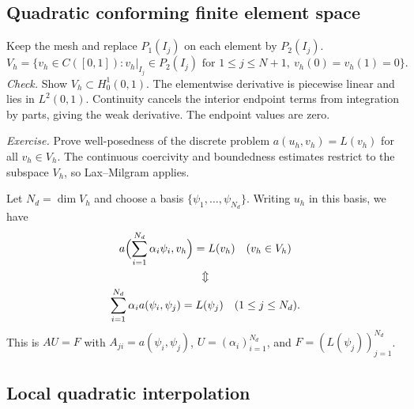 \documentclass[11pt,a4paper]{article}
\begin{document}
\subsection{Quadratic conforming finite element space}

Keep the mesh and replace \(P_1(I_j)\) on each element by \(P_2(I_j)\).
\[
 V_h=\bigl\{v_h\in C([0,1]):v_h|_{I_j}\in P_2(I_j)
 \text{ for }1\le j\le N+1,\ v_h(0)=v_h(1)=0\bigr\}.
\]
\emph{Check.} Show \(V_h\subset H_0^1(0,1)\). The elementwise derivative
is piecewise linear and lies in \(L^2(0,1)\). Continuity cancels the
interior endpoint terms from integration by parts, giving the weak
derivative. The endpoint values are zero.

\emph{Exercise.} Prove well-posedness of the discrete problem
\(a(u_h,v_h)=L(v_h)\) for all \(v_h\in V_h\). The continuous
coercivity and boundedness estimates restrict to the subspace \(V_h\),
so Lax--Milgram applies.

Let \(N_d=\dim V_h\) and choose a basis
\(\{\psi_1,\ldots,\psi_{N_d}\}\). Writing \(u_h\) in this basis, we have
\[
 \begin{gathered}
 a\Bigl(\sum_{i=1}^{N_d}\alpha_i\psi_i,v_h\Bigr)=L(v_h)
 \quad(v_h\in V_h)\\
 \Updownarrow\\
 \sum_{i=1}^{N_d}\alpha_i a(\psi_i,\psi_j)=L(\psi_j)
 \quad(1\le j\le N_d).
 \end{gathered}
\]
This is \(AU=F\) with \(A_{ji}=a(\psi_i,\psi_j)\),
\(U=(\alpha_i)_{i=1}^{N_d}\), and \(F=(L(\psi_j))_{j=1}^{N_d}\).

\subsection{Local quadratic interpolation}
\end{document}
